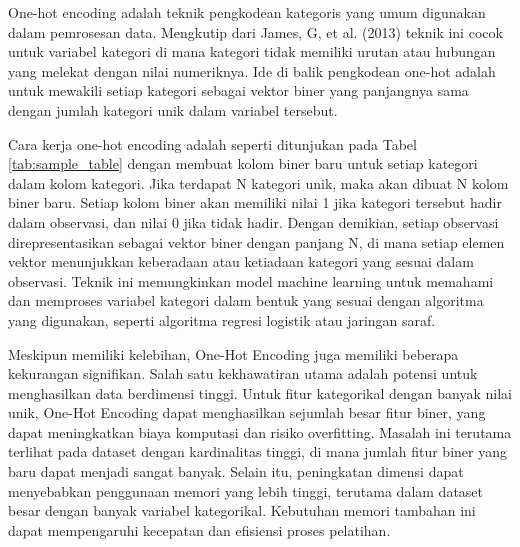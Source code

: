 One-hot encoding adalah teknik pengkodean kategoris yang umum digunakan dalam pemrosesan data. Mengkutip dari James, G, et al. (2013) teknik ini cocok untuk variabel kategori di mana kategori tidak memiliki urutan atau hubungan yang melekat dengan nilai numeriknya. Ide di balik pengkodean one-hot adalah untuk mewakili setiap kategori sebagai vektor biner yang panjangnya sama dengan jumlah kategori unik dalam variabel tersebut.

\begin{table}[htbp]
    \caption{Sample Encoding Data}
    \centering
    \label{tab:sample_table}
\end{table}


Cara kerja one-hot encoding adalah seperti ditunjukan pada Tabel \ref{tab:sample_table} dengan membuat kolom biner baru untuk setiap kategori dalam kolom kategori. Jika terdapat N kategori unik, maka akan dibuat N kolom biner baru. 
Setiap kolom biner akan memiliki nilai 1 jika kategori tersebut hadir dalam observasi, dan nilai 0 jika tidak hadir. Dengan demikian, setiap observasi direpresentasikan sebagai vektor biner dengan panjang N, di mana setiap elemen vektor menunjukkan keberadaan atau ketiadaan kategori yang sesuai dalam observasi. Teknik ini memungkinkan model machine learning untuk memahami dan memproses variabel kategori dalam bentuk yang sesuai dengan algoritma yang digunakan, seperti algoritma regresi logistik atau jaringan saraf.

Meskipun memiliki kelebihan, One-Hot Encoding juga memiliki beberapa kekurangan signifikan. Salah satu kekhawatiran utama adalah potensi untuk menghasilkan data berdimensi tinggi. Untuk fitur kategorikal dengan banyak nilai unik, One-Hot Encoding dapat menghasilkan sejumlah besar fitur biner, yang dapat meningkatkan biaya komputasi dan risiko overfitting. Masalah ini terutama terlihat pada dataset dengan kardinalitas tinggi, di mana jumlah fitur biner yang baru dapat menjadi sangat banyak. Selain itu, peningkatan dimensi dapat menyebabkan penggunaan memori yang lebih tinggi, terutama dalam dataset besar dengan banyak variabel kategorikal. Kebutuhan memori tambahan ini dapat mempengaruhi kecepatan dan efisiensi proses pelatihan.
